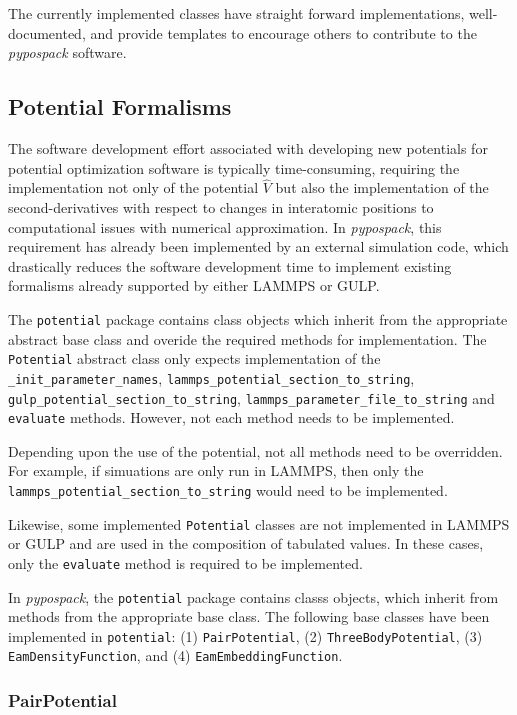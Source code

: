 The currently implemented classes have straight forward implementations, well-documented, and provide templates to encourage others to contribute to the \emph{pypospack} software.

\subsection{Potential Formalisms}

The software development effort associated with developing new potentials for potential optimization software is typically time-consuming, requiring the implementation not only of the potential $\hat{V}$ but also the implementation of the second-derivatives with respect to changes in interatomic positions to computational issues with numerical approximation.  In \emph{pypospack}, this requirement has already been implemented by an external simulation code, which drastically reduces the software development time to implement existing formalisms already supported by either LAMMPS or GULP.

The \verb|potential| package contains class objects which inherit from the appropriate abstract base class and overide the required methods for implementation.  The \verb|Potential| abstract class only expects implementation of the \verb|_init_parameter_names|, \verb|lammps_potential_section_to_string|, \verb|gulp_potential_section_to_string|, \verb|lammps_parameter_file_to_string| and \verb|evaluate| methods.  However, not each method needs to be implemented.

Depending upon the use of the potential, not all methods need to be overridden.  For example, if simuations are only run in LAMMPS, then only the \verb|lammps_potential_section_to_string| would need to be implemented.

Likewise, some implemented \verb|Potential| classes are not implemented in LAMMPS or GULP and are used in the composition of tabulated values.  In these cases, only the \verb|evaluate| method is required to be implemented.

In \emph{pypospack}, the \verb|potential| package contains classs objects, which inherit from methods from the appropriate base class.  The following base classes have been implemented in \verb|potential|: (1) \verb|PairPotential|, (2) \verb|ThreeBodyPotential|, (3) \verb|EamDensityFunction|, and (4) \verb|EamEmbeddingFunction|.

\subsubsection{PairPotential}


